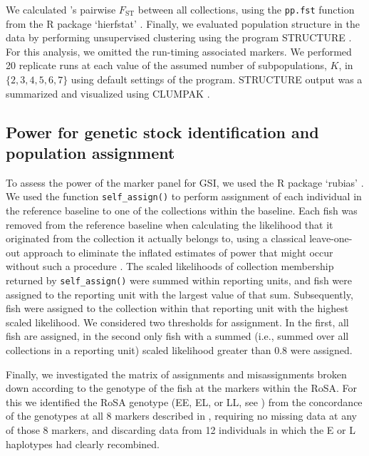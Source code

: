 We calculated \citet{weir1984estimating}'s pairwise $F_\mathrm{ST}$ between
all collections, using the {\footnotesize\tt pp.fst} function from the R
package `hierfstat' \citep{hierfstat}. Finally, we evaluated population
structure in the data by performing unsupervised clustering 
using the program STRUCTURE \citep{pritchard2000inference,falush2003inference}.
For this analysis, we omitted the run-timing associated markers.
We performed 20 replicate runs at each value of the assumed number of
subpopulations, $K$, in $\{2, 3, 4, 5, 6, 7\}$
using default settings of the program.  STRUCTURE output was
a summarized and visualized using CLUMPAK
\citep{kopelman2015clumpak}.






\subsection*{Power for genetic stock identification and population assignment}

To assess the power of the marker panel for GSI, we used the R package
`rubias' \citep{moran2019bayesian}.  We used the function {\tt self\_assign()}
to perform assignment of each individual in the reference baseline to one of the
collections within the baseline.  Each fish was removed from the reference baseline
when calculating the likelihood that it originated from the collection it actually belongs
to, using a classical leave-one-out approach to eliminate the inflated estimates of
power that might occur without such a procedure \citep{anderson2008improved}.
The scaled likelihoods of collection membership returned by
{\tt self\_assign()} were summed within reporting units, and fish were
assigned to the reporting unit with the largest value of that sum.  Subsequently,
fish were assigned to the collection within that reporting unit with the highest
scaled likelihood.  We considered two thresholds for assignment.  In the first,
all fish are assigned, in the second only fish with a summed (i.e., summed
over all collections in a reporting unit)
scaled likelihood greater than 0.8 were assigned.

Finally, we investigated the matrix of assignments and misassignments
broken down according to the genotype of the fish at the markers within
the RoSA.  For this we identified the RoSA genotype (EE, EL, or LL, see
\citealt{thompson2020complex}) from the concordance of the genotypes
at all 8 markers described in \citep{thompson2020complex}, requiring no missing
data at any of those 8 markers, and discarding data from 12 individuals
in which the E or L haplotypes had clearly recombined.



